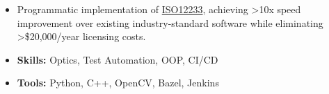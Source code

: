 \documentclass[letterpaper]{twentysecondcv} %
\begin{document}
\begin{twenty}
{\begin{itemize}
        \item Programmatic implementation of \href{https://www.iso.org/standard/88626.html}{ISO12233}, achieving >10x speed improvement over existing industry-standard software while eliminating >\$20,000/year licensing costs.
         \item \textbf{Skills:} Optics, Test Automation, OOP, CI/CD 
        \item \textbf{Tools:} Python, C++, OpenCV, Bazel, Jenkins 
    \end{itemize}
    	}
        
\end{twenty}

\end{document}
